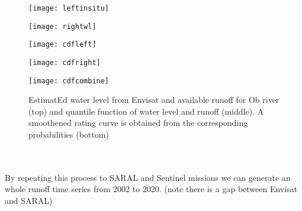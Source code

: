 \begin{figure}[htbp]
	\centering
	\begin{minipage}[t]{0.45\textwidth}
		\centering
		\texttt{[image: leftinsitu]} %
	\end{minipage}
	\begin{minipage}[t]{0.45\textwidth}
		\centering
		\texttt{[image: rightwl]} %
	\end{minipage}
	\begin{minipage}[t]{0.45\textwidth}
		\centering
		\texttt{[image: cdfleft]} %
	\end{minipage}
	\begin{minipage}[t]{0.45\textwidth}
		\centering
		\texttt{[image: cdfright]} %
	\end{minipage}
	\begin{minipage}[t]{0.45\textwidth}
		\centering
		\texttt{[image: cdfcombine]} %
	\end{minipage}
	\caption{EstimatEd water level from Envisat and available runoff for Ob river (top) and quantile function of water level and runoff (middle). A smoothened rating curve is obtained from the corresponding probabilities (bottom)}
	\label{fig:wltodischarge}
\end{figure}\\\\
By repeating this process to SARAL and Sentinel missions we can generate an whole runoff time series from 2002 to 2020. (note there is a gap between Envisat and SARAL) 